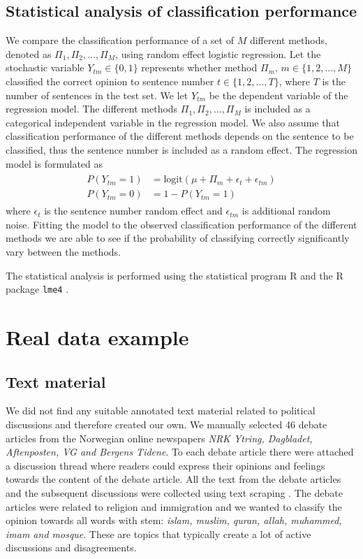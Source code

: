 \documentclass[11pt]{article}
\begin{document}
\subsection{Statistical analysis of classification performance}
\label{sec:sa}

We compare the classification performance of a set of $M$ different methods, denoted as $\Pi_1, \Pi_2, \ldots, \Pi_M$, using random effect logistic regression. Let the stochastic variable $Y_{tm} \in \{0,1\}$ represents whether method $\Pi_m, \, m \in \{1,2,\ldots,M\}$ classified the correct opinion to sentence number $t \in \{1,2,\ldots,T\}$, where $T$ is the number of sentences in the test set. We let $Y_{tm}$ be the dependent variable of the regression model. The different methods $\Pi_1, \Pi_2, \ldots, \Pi_M$ is included as a categorical independent variable in the regression model. We also assume that classification performance of the different methods depends on the sentence to be classified, thus the sentence number is included as a random effect. The regression model is formulated as
\begin{align}
  \label{eq:5}
  \begin{split}
    P(Y_{tm} = 1) &= \text{logit}(\mu + \Pi_m + \epsilon_t + \epsilon_{tm}) \\
    P(Y_{tm} = 0) &= 1 - P(Y_{tm} = 1)
  \end{split}
 \end{align}
where $\epsilon_t$ is the sentence number random effect and $\epsilon_{tm}$ is additional random noise. Fitting the model to the observed classification performance of the different methods we are able to see if the probability of classifying correctly significantly vary between the methods.

The statistical analysis is performed using the statistical program R \cite{R} and the R package \verb|lme4| \cite{lme4}.


\section{Real data example}
\label{sec:results}

\subsection{Text material}

We did not find any suitable annotated text material related to political discussions and therefore created our own. We manually selected 46 debate articles from the Norwegian online newspapers \textit{NRK Ytring, Dagbladet, Aftenposten, VG and Bergens Tidene}. To each debate article there were attached a discussion thread where readers could express their opinions and feelings towards the content of the debate article. All the text from the debate articles and the subsequent discussions were collected using text scraping \cite{Hammer13}. The debate articles were related to religion and immigration and we wanted to classify the opinion towards all words with stem: \textit{islam, muslim, quran, allah, muhammed, imam and mosque}. These are topics that typically create a lot of active discussions and disagreements.
\end{document}
